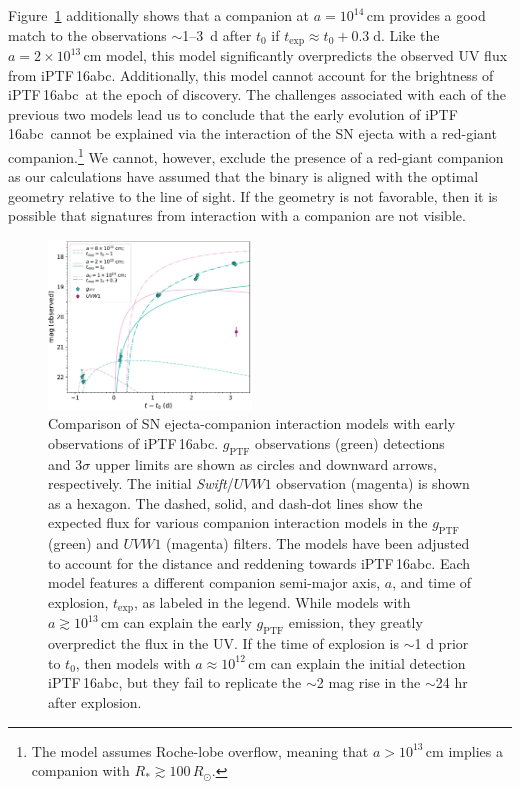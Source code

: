 \documentclass[twocolumn]{aastex61}
\newcommand{\abc}{iPTF\,16abc}
\begin{document}
Figure~\ref{fig:SN-companion} additionally shows that a companion at $a = 10^{14} \, \mathrm{cm}$ provides a good match to the observations $\sim$1--3~d after $t_0$ if $t_\mathrm{exp} \approx t_0 + 0.3 \; \mathrm{d}$. Like the $a = 2 \times 10^{13} \, \mathrm{cm}$ model, this model significantly overpredicts the observed UV flux from \abc. Additionally, this model cannot account for the brightness of \abc\ at the epoch of discovery. The challenges associated with each of the previous two models lead us to conclude that the early evolution of \abc\ cannot be explained via the interaction of the SN ejecta with a red-giant companion.\footnote{The \citet{2010ApJ...708.1025K} model assumes Roche-lobe overflow, meaning that $a > 10^{13} \, \mathrm{cm}$ implies a companion with $R_\ast \gtrsim 100 \, R_\odot$.} We cannot, however, exclude the presence of a red-giant companion as our calculations have assumed that the binary is aligned with the optimal geometry relative to the line of sight. If the geometry is not favorable, then it is possible that signatures from interaction with a companion are not visible. 


\begin{figure}[!thb]
  \centering
  \includegraphics[width=0.48\textwidth]{companion_lc.pdf}
  \caption{Comparison of SN ejecta-companion interaction models 
  with early observations of \abc. $g_\mathrm{PTF}$ observations 
  (green) detections and 3$\sigma$ upper limits are shown 
  as circles and downward arrows, respectively. The initial 
  \textit{Swift}/$UVW1$ observation (magenta) is shown as a 
  hexagon.
  The dashed, solid, and dash-dot lines show the expected flux 
  for various companion interaction models in 
  the $g_\mathrm{PTF}$ (green) and $UVW1$ (magenta) filters. The 
  models have been adjusted to account for the distance and 
  reddening towards \abc. Each 
  model features a different companion semi-major axis, $a$, and 
  time of explosion, $t_\mathrm{exp}$, as labeled in the 
  legend. While models with $a \gtrsim 10^{13} \, \mathrm{cm}$ can 
  explain the early $g_\mathrm{PTF}$ emission, they greatly 
  overpredict the flux in the UV. If the time of explosion is 
  $\sim$1 d prior to $t_0$, then models with $a \approx 10^{12} \, 
  \mathrm{cm}$ can explain the initial detection \abc, but they 
  fail to replicate the $\sim$2 mag rise in the $\sim$24 hr after 
  explosion.
  }
  \label{fig:SN-companion}
\end{figure}
\end{document}

